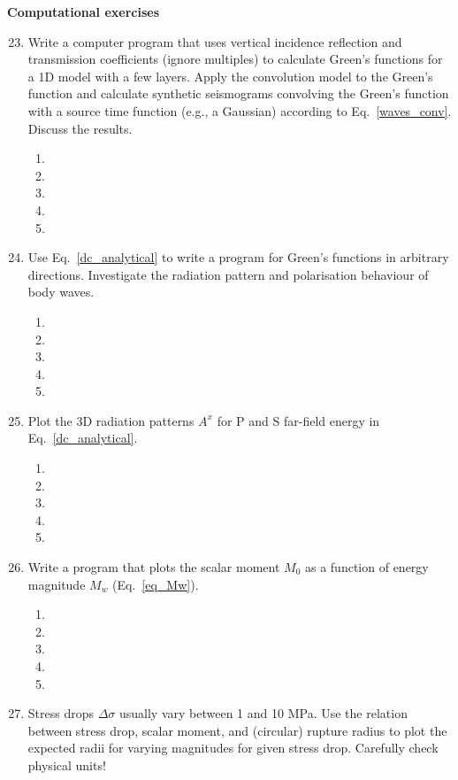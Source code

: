 {\bf Computational exercises}
\begin{enumerate}
\setcounter{enumi}{22}
\item
Write a computer program that uses vertical incidence reflection and transmission coefficients (ignore multiples) to calculate Green's functions for a 1D model with a few layers. Apply the  convolution model to the Green's function and calculate synthetic seismograms convolving the Green's function with a source time function (e.g., a Gaussian) according to Eq.~\ref{waves_conv}. Discuss the results. 
\begin{enumerate}
\item[]
\item[]
\item[] 
\item[]
\item[] 
\end{enumerate}
\item
Use Eq.~\ref{dc_analytical} to write a program for Green's functions in arbitrary directions. Investigate the radiation pattern and polarisation behaviour of body waves. 
\begin{enumerate}
\item[]
\item[]
\item[] 
\item[]
\item[] 
\end{enumerate}
\item
Plot the 3D radiation patterns $A^x$ for P and S far-field energy in Eq.~\ref{dc_analytical}. 
\begin{enumerate}
\item[]
\item[]
\item[] 
\item[]
\item[] 
\end{enumerate}
\item
Write a program that plots the scalar moment $M_0$ as a function of energy magnitude $M_w$ (Eq.~\ref{eq_Mw}).
\begin{enumerate}
\item[]
\item[]
\item[] 
\item[]
\item[] 
\end{enumerate}
\item
Stress drops $\Delta\sigma$ usually vary between 1 and 10 MPa. Use the relation between stress drop, scalar moment, and (circular) rupture radius to plot the expected radii for varying magnitudes for given stress drop. Carefully check physical units!

\end{enumerate}
